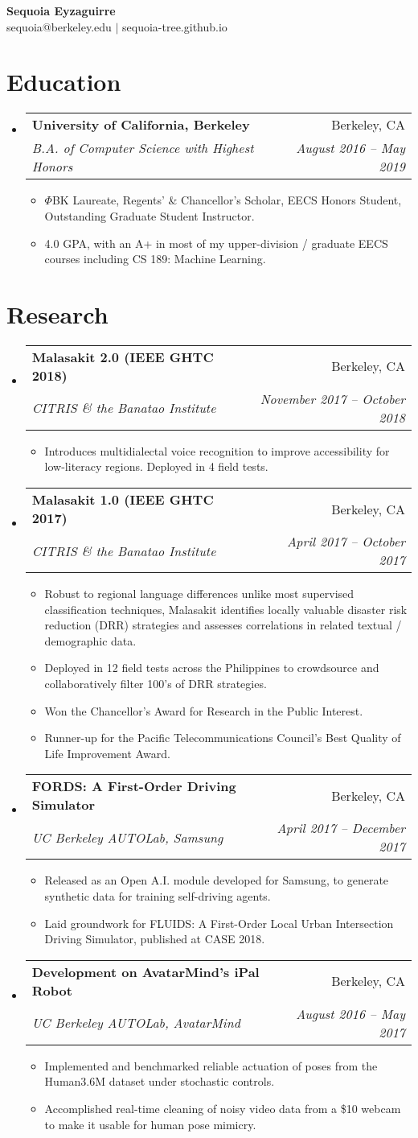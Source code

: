 \documentclass[letterpaper, 11pt]{article}
\makeatletter
\newcommand{\cvItem}[4]{
  \vspace{-1pt}
  \item
  \begin{tabular*}{0.97\textwidth}{l@{\extracolsep{\fill}}r}
    \textbf{#1} & #2\\
    \textit{\small #3} & \textit{\small #4}
  \end{tabular*}
  \vspace{-5pt}
}
\newcommand{\cvSubitem}[1]{
  \item
  \small{#1}
  \vspace{-2pt}
}
\newcommand{\cvItemStart}{\begin{itemize}[leftmargin=*]}
\newcommand{\cvItemEnd}{\end{itemize}}
\newcommand{\cvSubitemStart}{\begin{itemize}[leftmargin=*]}
\newcommand{\cvSubitemEnd}{\end{itemize}\vspace{-5pt}}
\makeatother
\begin{document}

\begin{center}
\textbf{\LARGE Sequoia Eyzaguirre}\\
sequoia@berkeley.edu $\vert$ sequoia-tree.github.io
\end{center}


\section{Education}

\cvItemStart
\cvItem
{University of California, Berkeley}
{Berkeley, CA}
{B.A. of Computer Science with Highest Honors}
{August 2016 -- May 2019}
\cvSubitemStart
\cvSubitem{
$\Phi$BK Laureate, Regents' \& Chancellor's Scholar, EECS Honors Student, Outstanding Graduate Student Instructor.
}
\cvSubitem{
4.0 GPA, with an A+ in most of my upper-division / graduate EECS courses including CS 189: Machine Learning.
}
\cvSubitemEnd
\cvItemEnd


\section{Research}

\cvItemStart
\cvItem
{Malasakit 2.0 (IEEE GHTC 2018)}
{Berkeley, CA}
{CITRIS \& the Banatao Institute}
{November 2017 -- October 2018}
\cvSubitemStart
\cvSubitem{
Introduces multidialectal voice recognition to improve accessibility for low-literacy regions. Deployed in 4 field tests.
}
\cvSubitemEnd
\cvItem
{Malasakit 1.0 (IEEE GHTC 2017)}
{Berkeley, CA}
{CITRIS \& the Banatao Institute}
{April 2017 -- October 2017}
\cvSubitemStart
\cvSubitem{
Robust to regional language differences unlike most supervised classification techniques, Malasakit identifies locally valuable disaster risk reduction (DRR) strategies and assesses correlations in related textual / demographic data.
}
\cvSubitem{
Deployed in 12 field tests across the Philippines to crowdsource and collaboratively filter 100's of DRR strategies.
}
\cvSubitem{
Won the Chancellor's Award for Research in the Public Interest.
}
\cvSubitem{
Runner-up for the Pacific Telecommunications Council's Best Quality of Life Improvement Award.
}
\cvSubitemEnd
\cvItem
{FORDS: A First-Order Driving Simulator}
{Berkeley, CA}
{UC Berkeley AUTOLab, Samsung}
{April 2017 -- December 2017}
\cvSubitemStart
\cvSubitem{
Released as an Open A.I. module developed for Samsung, to generate synthetic data for training self-driving agents.
}
\cvSubitem{
Laid groundwork for FLUIDS: A First-Order Local Urban Intersection Driving Simulator, published at CASE 2018.
}
\cvSubitemEnd
\cvItem
{Development on AvatarMind's iPal Robot}
{Berkeley, CA}
{UC Berkeley AUTOLab, AvatarMind}
{August 2016 -- May 2017}
\cvSubitemStart
\cvSubitem{
Implemented and benchmarked reliable actuation of poses from the Human3.6M dataset under stochastic controls.
}
\cvSubitem{
Accomplished real-time cleaning of noisy video data from a \$10 webcam to make it usable for human pose mimicry.
}
\cvSubitemEnd
\cvItemEnd
\end{document}
